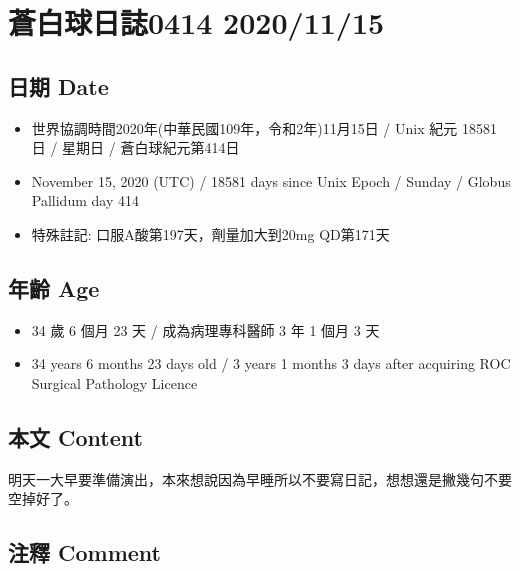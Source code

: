 \documentclass[
]{article}
\providecommand{\tightlist}{%
  \setlength{\itemsep}{0pt}\setlength{\parskip}{0pt}}
\begin{document}
\hypertarget{ux84bcux767dux7403ux65e5ux8a8c0414-20201115}{%
\section{蒼白球日誌0414
2020/11/15}\label{ux84bcux767dux7403ux65e5ux8a8c0414-20201115}}

\hypertarget{ux65e5ux671f-date-11}{%
\subsection{日期 Date}\label{ux65e5ux671f-date-11}}

\begin{itemize}
\tightlist
\item
  世界協調時間2020年(中華民國109年，令和2年)11月15日 / Unix 紀元 18581
  日 / 星期日 / 蒼白球紀元第414日
\item
  November 15, 2020 (UTC) / 18581 days since Unix Epoch / Sunday /
  Globus Pallidum day 414
\item
  特殊註記: 口服A酸第197天，劑量加大到20mg QD第171天
\end{itemize}

\hypertarget{ux5e74ux9f61-age-11}{%
\subsection{年齡 Age}\label{ux5e74ux9f61-age-11}}

\begin{itemize}
\tightlist
\item
  34 歲 6 個月 23 天 / 成為病理專科醫師 3 年 1 個月 3 天
\item
  34 years 6 months 23 days old / 3 years 1 months 3 days after
  acquiring ROC Surgical Pathology Licence
\end{itemize}

\hypertarget{ux672cux6587-content-11}{%
\subsection{本文 Content}\label{ux672cux6587-content-11}}

明天一大早要準備演出，本來想說因為早睡所以不要寫日記，想想還是撇幾句不要空掉好了。

\hypertarget{ux6ce8ux91cb-comment-11}{%
\subsection{注釋 Comment}\label{ux6ce8ux91cb-comment-11}}
\end{document}
